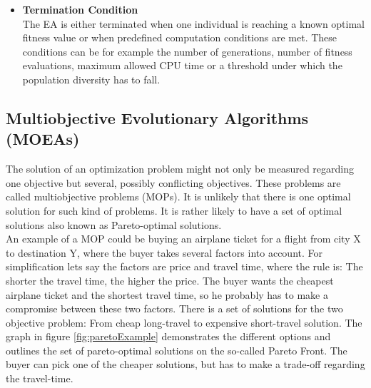 \begin{itemize}
        \item \textbf{Termination Condition}\\
        The EA is either terminated when one individual is reaching a known optimal fitness value or when predefined computation conditions are met. These conditions can be for example the number of generations, number of fitness evaluations, maximum allowed CPU time or a threshold under which the population diversity has to fall.
    \end{itemize}
        
    \subsection{Multiobjective Evolutionary Algorithms (MOEAs)}
    The solution of an optimization problem might not only be measured regarding one objective but several, possibly conflicting objectives. These problems are called multiobjective problems (MOPs). It is unlikely that there is one optimal solution for such kind of problems. It is rather likely to have a set of optimal solutions also known as Pareto-optimal solutions.\\
    An example of a MOP could be buying an airplane ticket for a flight from city X to destination Y, where the buyer takes several factors into account. For simplification lets say the factors are price and travel time, where the rule is: The shorter the travel time, the higher the price. The buyer wants the cheapest airplane ticket and the shortest travel time, so he probably has to make a compromise between these two factors. There is a set of solutions for the two objective problem: From cheap long-travel to expensive short-travel solution. The graph in figure \ref{fig:paretoExample} demonstrates the different options and outlines the set of pareto-optimal solutions on the so-called Pareto Front. The buyer can pick one of the cheaper solutions, but has to make a trade-off regarding the travel-time.\\
